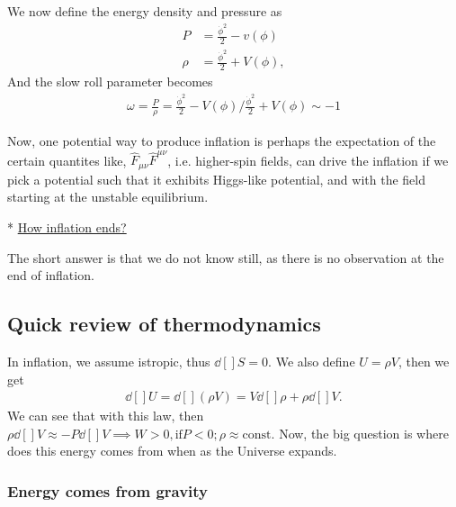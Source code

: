 \documentclass[a4paper, 12pt]{article}
\begin{document}
{{{ We now define the energy density and pressure as 
 \begin{align}
  \label{inflaton pressure and energy density}
   P &= \frac{\dot{\phi}^{2} }{2} - v(\phi) \\ 
    \rho &= \frac{\dot{\phi}^2}{2} + V(\phi), 
 \end{align}
And the slow roll parameter becomes 
\begin{align}
  \label{slow roll becomes}
  \omega = \frac{P}{\rho} = \frac{\dot{\phi}^2}{2} - V(\phi) /
  \frac{\dot{\phi}^2}{2} + V(\phi) \sim -1
\end{align} 

 Now, one potential way to produce inflation is perhaps the expectation
 of the certain quantites like, \( \hat{F}_{\mu \nu} \hat{F}^{\mu
 \nu} \), i.e. higher-spin fields, can drive the inflation if we pick a
 potential such that it exhibits Higgs-like potential, and with the field
 starting at the unstable equilibrium.

* \underline{How inflation ends?} 

The short answer is that we do not know still, as there is no observation
at the end of inflation.


\subsection{Quick review of thermodynamics}%
  \label{sub:Quick review of thermodynamics}

  In inflation, we assume istropic, thus \( \dd[]{S} = 0 \). We also define
  \( U = \rho V \), then we get 
  \begin{align}
    \label{1st law of TD in inflation}
    \dd[]{U} = \dd[]{(\rho V)} = V \dd[]{\rho} + \rho \dd[]{V}.
  \end{align} We can see that with this law, then \( \rho \dd[]{V}
  \approx - P \dd[]{V} \implies W > 0, \mathrm{ if } P < 0; \rho \approx
  \mathrm{const.} \) Now, the big question is where does this energy
  comes from when as the Universe expands. 

  \subsubsection{Energy comes from gravity}%
    \label{sub:{Energy comes from gravity}



   \begin{align}
    \label{energy comes from gravity}
     - \frac{3 H^2}{8 \pi G} + \rho \equiv 0, \hspace{0.5cm}( 00
     - \textnormal{component of EFE} )
   \end{align} 


}}}}
\end{document}
